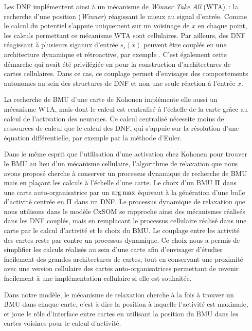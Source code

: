 \documentclass[../main]{subfiles}
\begin{document}
Les DNF implémentent ainsi à un mécanisme de \emph{Winner Take All} (WTA)~: la recherche d'une position (\emph{Winner}) réagissant le mieux au signal d'entrée.
Comme le calcul du potentiel s'appuie uniquement sur un voisinage de $x$ en chaque point, les calculs permettant ce mécanisme WTA sont cellulaires.
Par ailleurs, des DNF réagissant à plusieurs siganux d'entrée $s_i(x)$ peuvent être couplés en une architecture dynamique et rétroactive, par exemple \cite{Sandamirskaya2014DynamicNF}. C'est également cette démarche qui avait été privilégiée en\cite{khouzam_neural_2014,menard05} pour la construction d'architectures de cartes cellulaires.
Dans ce cas, ce couplage permet d'envisager des comportements autonomes au sein des structures de DNF et non une seule réaction à l'entrée $x$.

La recherche de BMU d'une carte de Kohonen implémente elle aussi un mécanisme WTA, mais dont le calcul est centralisé à l'échelle de la carte grâce au calcul de l'activation des neurones.
Ce calcul centralisé nécessite moins de ressources de calcul que le calcul des DNF, qui s'appuie sur la résolution d'une équation différentielle, par exemple par la méthode d'Euler. 

Dans le même esprit que l'utilisation d'une activation chez Kohonen pour trouver le BMU au lieu d'un mécanisme cellulaire, l'algorithme de relaxation que nous avons proposé cherche à conserver un processus dynamique de recherche de BMU mais en plaçant les calculs à l'échelle d'une carte. 
Le choix d'un BMU $\Pi$ dans une carte auto-organisatrice par un $\operatorname*{arg\,max}$ équivaut à la génération d'une bulle d'activité centrée en $\Pi$ dans un DNF. 
Le processus dynamique de relaxation que nous utilisons dans le modèle CxSOM se rapproche ainsi des mécanismes réalisés dans les DNF couplés, mais en remplacant le processus cellulaire réalisé dans une carte par le calcul d'activité et le choix du BMU. Le couplage entre les activité des cartes reste par contre un processus dynamique.
Ce choix nous a permis de simplifier les calculs réalisés au sein d'une carte afin d'envisager d'étudier facilement des grandes architectures de cartes, tout en conservant une proximité avec une version cellulaire des cartes auto-organisatrices permettant de revenir facilement à une implémentation cellulaire si elle est souhaitée.

Dans notre modèle, le mécanisme de relaxation cherche à la fois à trouver un BMU dans chaque carte, c'est à  dire la position à laquelle l'activité est maximale, et joue le rôle d'interface entre cartes en utilisant la position du BMU dans les cartes voisines pour le calcul d'activité. 
\end{document}
